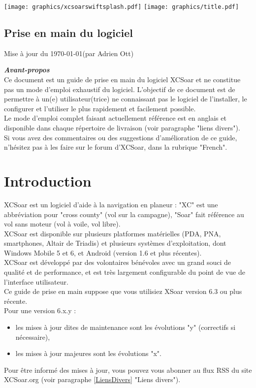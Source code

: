 \documentclass{article}
\begin{document}
%
\begin{center}
\texttt{[image: graphics/xcsoarswiftsplash.pdf]}
\vskip 0.5cm
\texttt{[image: graphics/title.pdf]}
\subsection*{Prise en main du logiciel}
\end{center}
%
\begin{flushright}
Mise à jour du \today \space(par Adrien Ott)
\end{flushright}
%
\pagebreak
\noindent
\textbf{\textit{Avant-propos}}\\
Ce document est un guide de prise en main du logiciel XCSoar et ne constitue pas un mode d'emploi exhaustif du logiciel. L'objectif de ce document est de permettre à un(e) utilisateur(trice) ne connaissant pas le logiciel de l'installer, le configurer et l'utiliser le plus rapidement et facilement possible.\\Le mode d'emploi complet faisant actuellement référence est en anglais et disponible dans chaque répertoire de livraison (voir paragraphe "liens divers").\\Si vous avez des commentaires ou des suggestions d'amélioration de ce guide, n'hésitez pas à les faire sur le forum d'XCSoar, dans la rubrique "French".

%

\section{Introduction}
\noindent
XCSoar est un logiciel d'aide à la navigation en planeur : "XC" est une abbréviation pour "cross county" (vol sur la campagne), "Soar" fait référence au vol sans moteur (vol à voile, vol libre).\\
XCSoar est disponible sur plusieurs platformes matérielles (PDA, PNA, smartphones, Altair de Triadis) et plusieurs systèmes d'exploitation, dont Windows Mobile 5 et 6, et Android (version 1.6 et plus récentes).\\
XCSoar est développé par des volontaires bénévoles avec un grand souci de qualité et de performance, et est très largement configurable du point de vue de l'interface utilisateur.\\
Ce guide de prise en main suppose que vous utilisiez XSoar version 6.3 ou plus récente.\\
Pour une version 6.x.y :
\begin{itemize}
\item les mises à jour dites de maintenance sont les évolutions "y" (correctifs si nécessaire),
\item les mises à jour majeures sont les évolutions "x".
\end{itemize}
%
Pour être informé des mises à jour, vous pouvez vous abonner au flux RSS du site XCSoar.org (voir paragraphe \ref{LiensDivers} "Liens divers").\\
%
\end{document}
